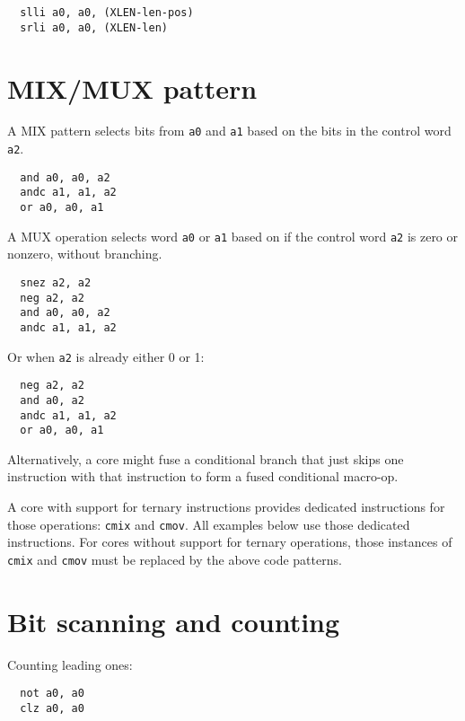 \begin{verbatim}
  slli a0, a0, (XLEN-len-pos)
  srli a0, a0, (XLEN-len)
\end{verbatim}


\section{MIX/MUX pattern}
\label{mixmux}

A MIX pattern selects bits from {\tt a0} and {\tt a1} based on the bits in
the control word {\tt a2}.

\begin{verbatim}
  and a0, a0, a2
  andc a1, a1, a2
  or a0, a0, a1
\end{verbatim}

A MUX operation selects word {\tt a0} or {\tt a1} based on if the control
word {\tt a2} is zero or nonzero, without branching.

\begin{verbatim}
  snez a2, a2
  neg a2, a2
  and a0, a0, a2
  andc a1, a1, a2
\end{verbatim}

Or when {\tt a2} is already either 0 or 1:

\begin{verbatim}
  neg a2, a2
  and a0, a2
  andc a1, a1, a2
  or a0, a0, a1
\end{verbatim}

Alternatively, a core might fuse a conditional branch that just skips one
instruction with that instruction to form a fused conditional macro-op.

A core with support for ternary instructions provides dedicated instructions
for those operations: {\tt cmix} and {\tt cmov}. All examples below use those
dedicated instructions. For cores without support for ternary operations, those
instances of {\tt cmix} and {\tt cmov} must be replaced by the above code
patterns.


\section{Bit scanning and counting}

Counting leading ones:

\begin{verbatim}
  not a0, a0
  clz a0, a0
\end{verbatim}

